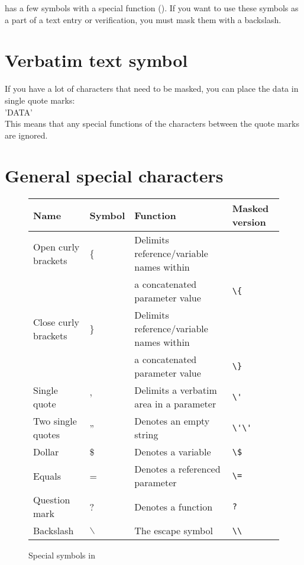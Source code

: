 \app{} has a few symbols with a special function (). If you want to use these symbols as a part of a text entry or verification, you must mask them with a backslash. 


\section{Verbatim text symbol}
\label{verbatimsymbol}
If you have a lot of characters that need to be masked, you can place the data in single quote marks:\\
'DATA'\\
 This means that any special functions of the characters between the quote marks are ignored. 

\section{General special characters}
\begin{figure}
\begin{tabular}{|l|l|l|l|} \hline
\centering
Name & Symbol & Function & Masked version \\ \hline
Open curly brackets & \{ & Delimits reference/variable names within\\
&& a concatenated parameter value & \verb+\{+\\ \hline
Close curly brackets &\} & Delimits reference/variable names within\\
&& a concatenated parameter value & \verb+\}+\\ \hline
Single quote &' & Delimits a verbatim area in a parameter &\verb+\'+\\ \hline
Two single quotes & '' & Denotes an empty string & \verb+\'\'+\\ \hline
Dollar &\$ & Denotes a variable &\verb+\$+\\ \hline
Equals & = & Denotes a referenced parameter & \verb+\=+\\ \hline
Question mark & ? & Denotes a function & \verb+?+\\ \hline
Backslash &$\backslash$& The escape symbol & \verb+\\+\\ \hline
\end{tabular}
\label{specialchars}
\caption{Special symbols in \app{}}
\end{figure}
\clearpage

